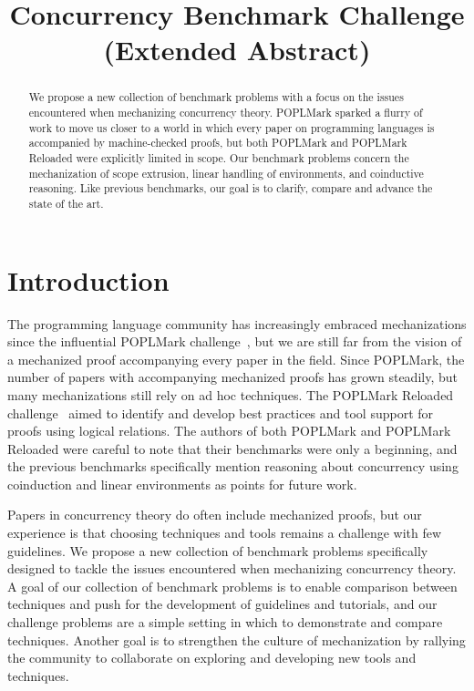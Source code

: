 \documentclass[adraft,copyright,creativecommons]{eptcs}
\title{Concurrency Benchmark Challenge (Extended Abstract)}
\begin{document}
\maketitle

\begin{abstract}
  We propose a new collection of benchmark problems with a focus on the issues encountered when mechanizing concurrency theory.
  POPLMark sparked a flurry of work to move us closer to a world in which every paper on programming languages is accompanied by machine-checked proofs, but both POPLMark and POPLMark Reloaded were explicitly limited in scope.
  Our benchmark problems concern the mechanization of scope extrusion, linear handling of environments, and coinductive reasoning.
  Like previous benchmarks, our goal is to clarify, compare and advance the state of the art.
\end{abstract}

\section{Introduction}
The programming language community has increasingly embraced mechanizations since the influential POPLMark challenge~\cite{POPLMark}, but we are still far from the vision of a mechanized proof accompanying every paper in the field.
Since POPLMark, the number of papers with accompanying mechanized proofs has grown steadily, but many mechanizations still rely on ad hoc techniques.
The POPLMark Reloaded challenge~\cite{POPLMarkReloaded} aimed to identify and develop best practices and tool support for proofs using logical relations.
The authors of both POPLMark and POPLMark Reloaded were careful to note that their benchmarks were only a beginning, and the previous benchmarks specifically mention reasoning about concurrency using coinduction and linear environments as points for future work.

Papers in concurrency theory do often include mechanized proofs, but our experience is that choosing techniques and tools remains a challenge with few guidelines.
We propose a new collection of benchmark problems specifically designed to tackle the issues encountered when mechanizing concurrency theory.
A goal of our collection of benchmark problems is to enable comparison between techniques and push for the development of guidelines and tutorials, and our challenge problems are a simple setting in which to demonstrate and compare techniques.
Another goal is to strengthen the culture of mechanization by rallying the community to collaborate on exploring and developing new tools and techniques.
\end{document}
